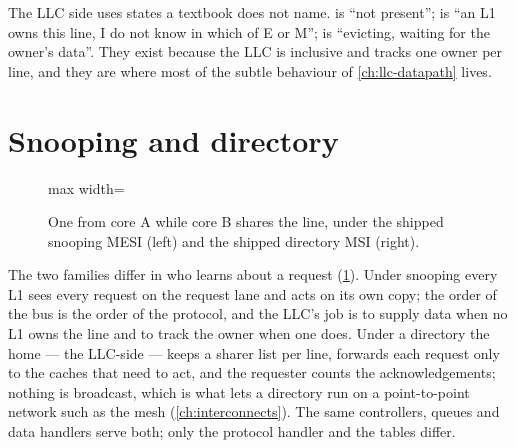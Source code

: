 The LLC side uses states a textbook does not name.  is ``not present'';
 is ``an L1 owns this line, I do not know in which of E or M'';  is
``evicting, waiting for the owner's data''. They exist because the LLC is inclusive and tracks
one owner per line, and they are where most of the subtle behaviour of \cref{ch:llc-datapath}
lives.

\section{Snooping and directory}

\begin{figure}[htbp]\centering
\begin{adjustbox}{max width=\textwidth}\end{adjustbox}
\caption{One  from core A while core B shares the line, under the shipped snooping
MESI (left) and the shipped directory MSI (right).}
\label{fig:snoop-vs-directory}
\end{figure}

The two families differ in who learns about a request (\cref{fig:snoop-vs-directory}). Under
snooping every L1 sees every request on the request lane and acts on its own copy; the order of
the bus is the order of the protocol, and the LLC's job is to supply data when no L1 owns the
line and to track the owner when one does. Under a directory the home --- the LLC-side
 --- keeps a sharer list per line, forwards each request only to
the caches that need to act, and the requester counts the acknowledgements; nothing is
broadcast, which is what lets a directory run on a point-to-point network such as the mesh
(\cref{ch:interconnects}). The same controllers, queues and data handlers serve both; only the
protocol handler and the tables differ.

